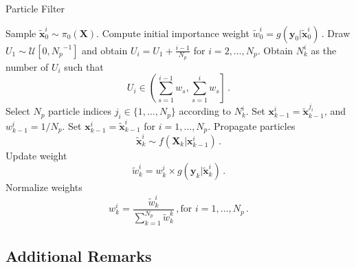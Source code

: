 \begin{algorithm}
\caption{Particle Filter}\label{alg:particle_filter}
\begin{algorithmic}[1]
  
\State Sample $\tilde{\boldsymbol{x}}_0^{i} \sim \pi_0(\boldsymbol{X})$.
\State Compute initial importance weight
$
\tilde{w}_0^{i} = g(\boldsymbol{y}_0 | \tilde{\boldsymbol{x}}_0^{i}) \,.
$
\EndFor
{}
 
\State Draw $U_{1} \sim \mathcal{U}\left[0, {N_p}^{-1}\right]$ and obtain $U_{i}=U_{1}+\frac{i-1}{N_p}$ for $i=2, \ldots, N_p$.
\State Obtain $N_k^{i}$ as the number of $U_i$ such that
$$
U_i \in \left(\sum_{s=1}^{i-1} w_{s}, \sum_{s=1}^{i} w_{s}\right] \,.
$$ 
\State Select $N_p$ particle indices $j_i \in \{1, \dots, N_p\}$ according to $N_k^{i}$.
\State Set $\boldsymbol{x}_{k-1}^{i} = \tilde{\boldsymbol{x}}_{k-1}^{j_i}$, and $w_{k-1}^{i} = 1/N_p$.
\EndFor
\Else 
\State Set $\boldsymbol{x}_{k-1}^{i} = \tilde{\boldsymbol{x}}_{k-1}^{i}$ for $i=1, \ldots, N_p$.
\EndIf
{}
\State Propagate particles 
$$
\tilde{\boldsymbol{x}}_k^{i} \sim f(\boldsymbol{X}_k|\boldsymbol{x}_{k-1}^{i}) \,.
$$
\State Update weight 
$$
\tilde{w}_k^{i} = {w}_k^{i} \times g(\boldsymbol{y}_k | \tilde{\boldsymbol{x}}_k^{i}) \,.
$$
\EndFor
\State Normalize weights
$$
w_k^{i} = \frac{\tilde{w}_k^{i}}{\sum_{k=1}^{N_p}\tilde{w}_k^{k}} \,, \text{for } i = 1, \dots, N_p \,.
$$
\EndFor
\end{algorithmic}
\end{algorithm}



\subsection{Additional Remarks} %
\label{ssub:additional_remarks}
